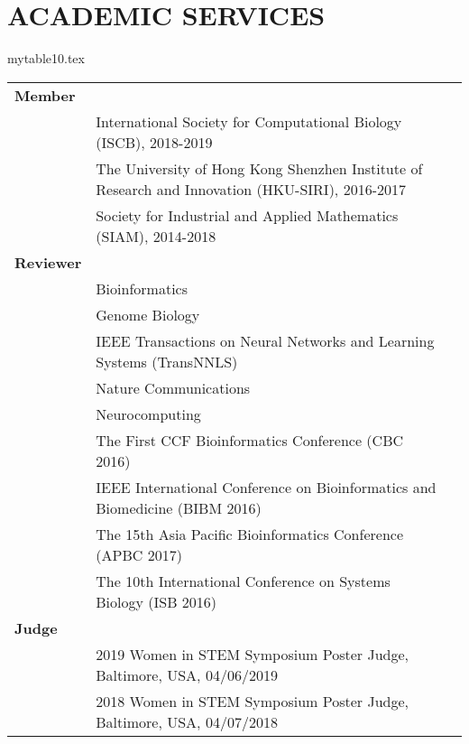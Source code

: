 \documentclass[10pt,letterpaper]{article}
\begin{document}
\section*{ACADEMIC SERVICES}
\begin{filecontents}{mytable10.tex}
\begin{longtable}{Xlr}
{\bf Member} & &\\
& International Society for Computational Biology (ISCB), 2018-2019 &\\
& The University of Hong Kong Shenzhen Institute of Research and Innovation (HKU-SIRI), 2016-2017&\\
 & Society for Industrial and Applied Mathematics (SIAM), 2014-2018 &\\
 {\bf Reviewer} &&\\
  & Bioinformatics &\\
&Genome Biology&\\
& IEEE Transactions on Neural Networks and Learning Systems (TransNNLS)&\\
& Nature Communications&\\
& Neurocomputing &\\
& The First CCF Bioinformatics Conference (CBC 2016)&\\
&IEEE International Conference on Bioinformatics and Biomedicine (BIBM 2016)&\\
&The 15th Asia Pacific Bioinformatics Conference (APBC 2017)&\\
& The 10th International Conference on Systems Biology (ISB 2016)&\\
{\bf Judge} & &\\
& 2019 Women in STEM Symposium Poster Judge, Baltimore, USA, 04/06/2019\\
&2018 Women in STEM Symposium Poster Judge, Baltimore, USA, 04/07/2018\\
\end{longtable}
\end{filecontents}
%
%
\end{document}
